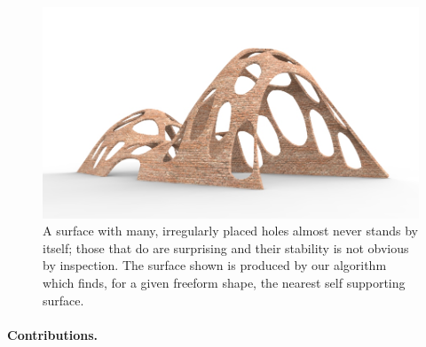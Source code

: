 \documentclass[review]{acmsiggraph}
\begin{document}
	\begin{figure}[t] 
	\includegraphics[width=\columnwidth]{arch-fig/cheesevault25.jpg} 
	\caption{A surface with many, irregularly placed holes almost 
never stands by itself; those that do are surprising and their stability 
is not obvious by inspection. The surface shown is produced by our 
algorithm which finds, for a given freeform shape, the nearest self\dash 
supporting surface.}
	\label{fig:cheese}
\end{figure}




\paragraph{Contributions.} 
\end{document}
